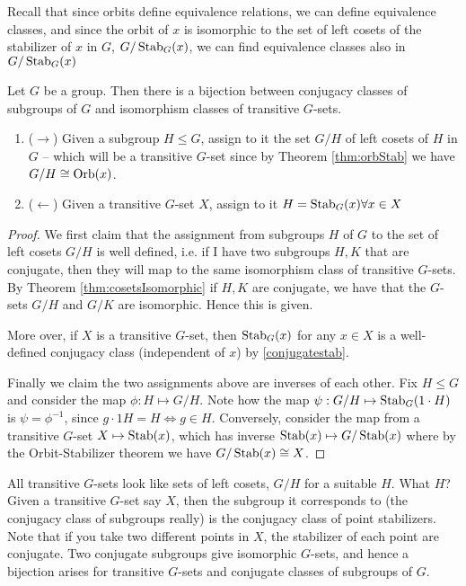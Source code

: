 Recall that since orbits define equivalence relations, we can define equivalence classes,
and since the orbit of $x$ is isomorphic to the set of left cosets of the stabilizer of
$x$ in $G$, $G/\operatorname*{Stab}_G(x)$, we can find equivalence classes also in $G/\operatorname*{Stab}_G(x)$
\begin{theorem}
  Let $G$ be a group. Then there is a bijection between conjugacy classes of subgroups of
  $G$ and isomorphism classes of transitive $G$-sets.
  \begin{enumerate}
    \item ($\rightarrow$) Given a subgroup $H\leq G$, assign to it the set $G/H$ of left
      cosets of $H$ in $G$ -- which will be a transitive $G$-set since by Theorem \ref{thm:orbStab} we
      have $G/H\cong \operatorname*{Orb}(x)$.
    \item ($\leftarrow$) Given a transitive $G$-set $X$, assign to it $H=\operatorname*{Stab}_G(x)\forall
      x\in X$
  \end{enumerate}
  \label{<+label+>}
\end{theorem}
\begin{proof}
  We first claim that the assignment from subgroups $H$ of $G$ to the set of left cosets
  $G/H$ is well defined, i.e. if I have two subgroups $H,K$ that are conjugate, then they
  will map to the same isomorphism class of transitive $G$-sets. By Theorem \ref{thm:cosetsIsomorphic} if $H,K$
  are conjugate, we have that the $G$-sets $G/H$ and $G/K$ are isomorphic. Hence this is
  given.

  More over, if $X$ is a transitive $G$-set, then $\operatorname*{Stab}_G(x)$ for any $x\in X$ is a
  well-defined conjugacy class (independent of $x$) by \ref{conjugatestab}.
   
  Finally we claim the two assignments above are inverses of each other. Fix $H\leq
  G$ and consider the map $\phi:H\mapsto G/H$. Note how the map
  $\psi:G/H\mapsto\operatorname*{Stab}_G(1\cdot H)$ is $\psi=\phi^{-1}$, since $g\cdot 1H=H \iff g\in H$.
  Conversely, consider the map from a transitive $G$-set $X\mapsto \operatorname*{Stab}(x)$, which has
  inverse $\operatorname*{Stab}(x)\mapsto G/\operatorname*{Stab}(x)$ where by the Orbit-Stabilizer theorem we have
  $G/\operatorname*{Stab}(x)\cong X$.
\end{proof}
All transitive $G$-sets look like sets of left cosets, $G/H$ for a suitable $H$. What $H$?
Given a transitive $G$-set say $X$, then the subgroup it corresponds to (the conjugacy
class of subgroups really) is the conjugacy class of point stabilizers.
Note that if you take two different points in $X$, the stabilizer of each point are
conjugate. Two conjugate subgroups give isomorphic $G$-sets, and hence a bijection arises for
transitive $G$-sets and conjugate classes of subgroups of $G$.
